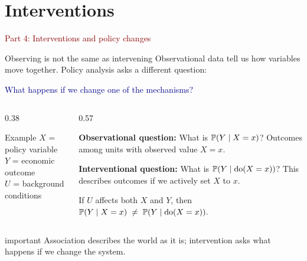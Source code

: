 \documentclass[dvipsnames,aspectratio=169,handout]{beamer}
\begin{document}
\section{Interventions}

\begin{frame}{}
\begin{center}
{\Huge \textcolor{DarkRed}{Part 4: Interventions and policy changes}}
\end{center}
\end{frame}

\begin{frame}{Observing is not the same as intervening}
Observational data tell us how variables move together. Policy analysis asks a different question:
\begin{center}
\large \textcolor{DarkBlue}{What happens if we change one of the mechanisms?}
\end{center}
\vspace{-3mm}
\begin{columns}[T]
\begin{column}{0.38\textwidth}
\begin{center}
\end{center}
\vspace{-4mm}
\begin{block}{Example}
$X$ = policy variable\\
$Y$ = economic outcome\\
$U$ = background conditions
\end{block}
\end{column}
\begin{column}{0.57\textwidth}
\begin{block}{\normalsize \textbf{Observational question:} What is \alert{$\P(Y\mid X=x)$}?}
Outcomes among units with observed value $X=x$.
\end{block}
\vspace{-3mm}
\begin{block}{\normalsize \textbf{Interventional question:} What is
\alert{$
\P(Y\mid \operatorname{do}(X=x))$}?
}
This describes outcomes if we actively set $X$ to $x$.
\end{block}
If $U$ affects both $X$ and $Y$, then\\[2mm]
\qquad\qquad$
\P(Y\mid X=x)\;\neq\; \P(Y\mid \operatorname{do}(X=x)).
$
\end{column}
\end{columns}
\smallskip
\begin{beamercolorbox}[wd=\textwidth,sep=7pt,center,rounded=true,shadow=true]{important}
\small Association describes the world as it is; intervention asks what happens if we change the system.
\end{beamercolorbox}
\end{frame}
\end{document}
